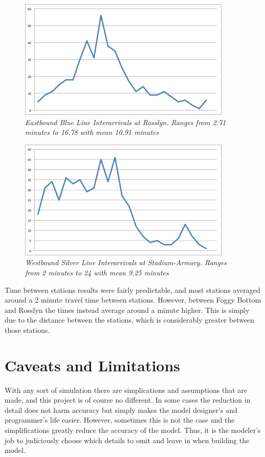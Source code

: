 \documentclass[a4paper,12pt]{article}
\begin{document}
\begin{figure}
\begin{center}
\includegraphics[width=4in]{../images/train_interarrivals/eastbound_blue_interarrivals.png}
\caption{\small \sl Eastbound Blue Line Interarrivals at Rosslyn. Ranges from 2.71 minutes to 16.78 with mean 10.91 minutes \label{fig:eastboundblueinterarrivals}}
\end{center}
\end{figure}

\begin{figure}
\begin{center}
\includegraphics[width=4in]{../images/train_interarrivals/westbound_silver_interarrivals.png}
\caption{\small \sl Westbound Silver Line Interarrivals at Stadium-Armory. Ranges from 2 minutes to 24 with mean 9.25 minutes \label{fig:westboundsilverinterarrivals}}
\end{center}
\end{figure}

Time between stations results were fairly predictable, and most stations averaged around a 2 minute travel time between
stations. However, between Foggy Bottom and Rosslyn the times instead average around a minute higher. This is simply
due to the distance between the stations, which is considerably greater between those stations.

\section{Caveats and Limitations}
With any sort of simulation there are simplications and assumptions that are made, and this project is of course no
different. In some cases the reduction in detail does not harm accuracy but simply makes the model designer's and
programmer's life easier. However, sometimes this is not the case and the simplifications greatly reduce the accuracy
of the model. Thus, it is the modeler's job to judiciously choose which details to omit and leave in when building the
model.
\end{document}
